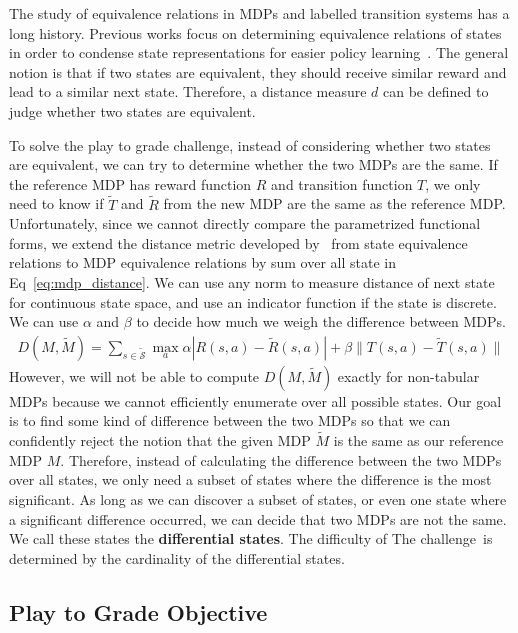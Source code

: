 \documentclass{article}
\def\gS{{\mathcal{S}}}
\newcommand{\OurTask}{The challenge~} %
\newcommand{\EDIT}[1]{#1}%
\begin{document}
The study of equivalence relations in MDPs and labelled transition systems has a long history. Previous works focus on determining equivalence relations of states in order to condense state representations for easier policy learning~\cite{ravindran2001symmetries,givan2003equivalence,ferns2004metrics,li2006towards,van2020plannable}. The general notion is that if two states are equivalent, they should receive similar reward and lead to a similar next state. Therefore, a distance measure $d$ can be defined to judge whether two states are equivalent.

\EDIT{To solve the play to grade challenge}, instead of considering whether two states are equivalent, we \EDIT{can try to determine} whether \EDIT{the} two MDPs are the same. If the reference MDP has reward function $R$ and transition function $T$, we only need to know if $\tilde T$ and $\tilde R$ from the new MDP are the same as the reference MDP. Unfortunately, since we cannot directly compare the parametrized functional forms, we extend the distance metric developed by~\cite{ferns2004metrics} from state equivalence relations to MDP equivalence relations by sum over all state in Eq~\ref{eq:mdp_distance}. We can use any norm to measure distance of next state for continuous state space, and use an indicator function if the state is discrete. We can use $\alpha$ and $\beta$ to decide how much we weigh the difference between MDPs.
\begin{align}
    D(M, \tilde M) = \sum_{s \in \tilde \gS} \max_a \alpha |R(s, a) - \tilde R(s, a)| + \beta \| T(s, a) - \tilde T(s, a) \|
\label{eq:mdp_distance}
\end{align}
However, we will not be able to compute $D(M, \tilde M)$ exactly for non-tabular MDPs because we cannot efficiently enumerate over all possible states. Our goal is to find some kind of difference between the two MDPs so that we can confidently reject the notion that the given MDP $\tilde M$ is the same as our reference MDP $M$. Therefore, instead of calculating the difference between the two MDPs over all states, we only need a subset of states where the difference is the most significant. As long as we can discover a subset of states, or even one state where a significant difference occurred, we can decide that two MDPs are not the same. We call these states the \textbf{differential states}.
The difficulty of \OurTask is determined by the cardinality of the differential states.

\subsection{Play to Grade Objective}
\vspace{-2mm} 
\end{document}
